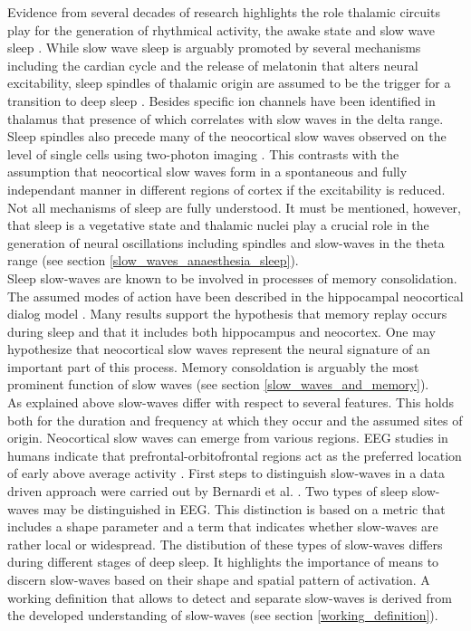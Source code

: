 Evidence from several decades of research highlights the role thalamic circuits play for the generation of rhythmical activity, the awake state and slow wave sleep \parencite{brown2012control}. While slow wave sleep is arguably promoted by several mechanisms including the cardian cycle and the release of melatonin that alters neural excitability, sleep spindles of thalamic origin are assumed to be the trigger for a transition to deep sleep \parencite[p. 347]{montagna2005fatal}. Besides specific ion channels have been identified in thalamus that presence of which correlates with slow waves in the delta range\parencite[p. 1112]{brown2012control}. Sleep spindles also precede many of the neocortical slow waves observed on the level of single cells using two-photon imaging \parencite{niethard2018cortical}. This contrasts with the assumption that neocortical slow waves form in a spontaneous and fully independant manner in different regions of cortex if the excitability is reduced. Not all mechanisms of sleep are fully understood. It must be mentioned, however, that sleep is a vegetative state and thalamic nuclei play a crucial role in the generation of neural oscillations including spindles and slow-waves in the theta range (see section \ref{slow_waves_anaesthesia_sleep}).\\
Sleep slow-waves are known to be involved in processes of memory consolidation. The assumed modes of action have been described in the hippocampal neocortical dialog model \parencite{buzsaki1996hippocampo}. Many results support the hypothesis that memory replay occurs during sleep and that it includes both hippocampus and neocortex. One may hypothesize that neocortical slow waves represent the neural signature of an important part of this process. Memory consoldation is arguably the most prominent function of slow waves (see section \ref{slow_waves_and_memory}).\\
As explained above slow-waves differ with respect to several features. This holds both for the duration and frequency at which they occur and the assumed sites of origin. Neocortical slow waves can emerge from various regions. EEG studies in humans indicate that prefrontal-orbitofrontal regions act as the preferred location of early above average activity \parencite[p. 1110]{brown2012control}. First steps to distinguish slow-waves in a data driven approach were carried out by Bernardi et al. \parencite*{bernardi2018local}. Two types of sleep slow-waves may be distinguished in EEG. This distinction is based on a metric that includes a shape parameter and a term that indicates whether slow-waves are rather local or widespread. The distibution of these types of slow-waves differs during different stages of deep sleep. It highlights the importance of means to discern slow-waves based on their shape and spatial pattern of activation. A working definition that allows to detect and separate slow-waves is derived from the developed understanding of slow-waves (see section \ref{working_definition}).

